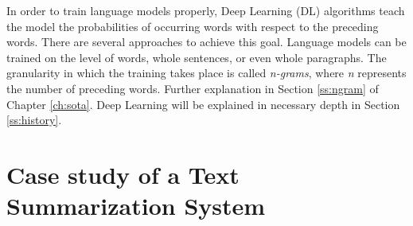 In order to train language models properly, Deep Learning (DL) algorithms teach the model the probabilities of occurring words with respect to the preceding words. There are several approaches to achieve this goal. Language models can be trained on the level of words, whole sentences, or even whole paragraphs. The granularity in which the training takes place is called \textit{n-grams}, where \textit{n} represents the number of preceding words. Further explanation in Section \ref{ss:ngram} of Chapter \ref{ch:sota}. Deep Learning will be explained in necessary depth in Section \ref{ss:history}.



\section{Case study of a Text Summarization System}







